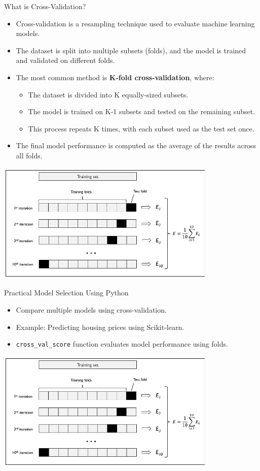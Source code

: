 \documentclass[11pt]{beamer}
\begin{document}
\begin{frame}{What is Cross-Validation?}
    \begin{itemize}
        \item Cross-validation is a resampling technique used to evaluate machine learning models.
        \item The dataset is split into multiple subsets (folds), and the model is trained and validated on different folds.
        \item The most common method is \textbf{K-fold cross-validation}, where:
        \begin{itemize}
            \item The dataset is divided into K equally-sized subsets.
            \item The model is trained on K-1 subsets and tested on the remaining subset.
            \item This process repeats K times, with each subset used as the test set once.
        \end{itemize}
        \item The final model performance is computed as the average of the results across all folds.
    \end{itemize}
    \includegraphics[width=0.8\textwidth]{../05-pictures/lesson-4-2_pic_1.png}
\end{frame}

\begin{frame}{Practical Model Selection Using Python}
    \begin{itemize}
        \item Compare multiple models using cross-validation.
        \item Example: Predicting housing prices using Scikit-learn.
        \item \texttt{cross\_val\_score} function evaluates model performance using folds.
    \end{itemize}
    \includegraphics[width=0.8\textwidth]{../05-pictures/lesson-4-2_pic_1.png}
\end{frame}
\end{document}
